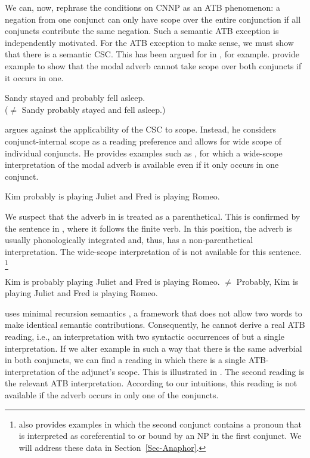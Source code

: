 \documentclass[output=paper]{langsci/langscibook}
\begin{document}
We can, now, rephrase the conditions on CNNP as an ATB phenomenon: a negation from one conjunct can only have scope over the entire conjunction if all conjuncts contribute the same negation. 
%
Such a semantic ATB exception is independently motivated. For the ATB exception to make sense, we must show that there is a semantic CSC. This has been argued for in 
\citet[83]{Winter:01}, for example.
\citet[323]{Copestake:al:05} 
 provide example  to show that the modal adverb  cannot take scope over both conjuncts if it occurs in one.

\ea \label{stay-asleep}
Sandy stayed and probably fell asleep.\\
($\not=$ Sandy probably stayed and fell asleep.)
\z

\citet[86--89]{Chaves:07} argues against the applicability of the CSC to scope. Instead, he considers conjunct-internal scope as a reading preference and allows for wide scope of individual conjuncts. He provides examples such as , for which a wide-scope interpretation of the modal adverb is available even if it only occurs in one conjunct.

\ea \label{romeojuliet}
Kim probably is playing Juliet and Fred is playing Romeo.
\z 

We suspect that the adverb in  is treated as a parenthetical. This is confirmed by the sentence in , where it follows the finite verb. 
In this position, 
the adverb is usually phonologically integrated and, thus, has a non-parenthetical interpretation. 
The wide-scope interpretation of  is not available for this sentence.%
\footnote{\citet{Chaves:07} also provides examples in which the second conjunct contains a pronoun that is interpreted as coreferential to or bound by an NP in the first conjunct. 
We will address these data in Section~\ref{Sec-Anaphor}.}


\ea
\label{romeojuliet2}
Kim is probably playing Juliet and Fred is playing Romeo.
\glt $\not=$ Probably, Kim is playing Juliet and Fred is playing Romeo.
\z 

\hspace*{-1.63637pt}\citet{Chaves:07} uses minimal recursion semantics \citep{Copestake:al:05}, a
 framework that does not allow two words to make identical semantic contributions. Consequently,
he cannot derive a real ATB reading, i.e., an interpretation with two syntactic occurrences of  but a single interpretation.  
If we alter example  in such a way that there is the same adverbial in both conjuncts, we can find a reading in which there is a single ATB-interpretation of the adjunct's scope. This is illustrated in . The second reading is the relevant ATB interpretation. According to our intuitions, this reading is not available if the adverb  occurs in only one of the conjuncts.
\end{document}
